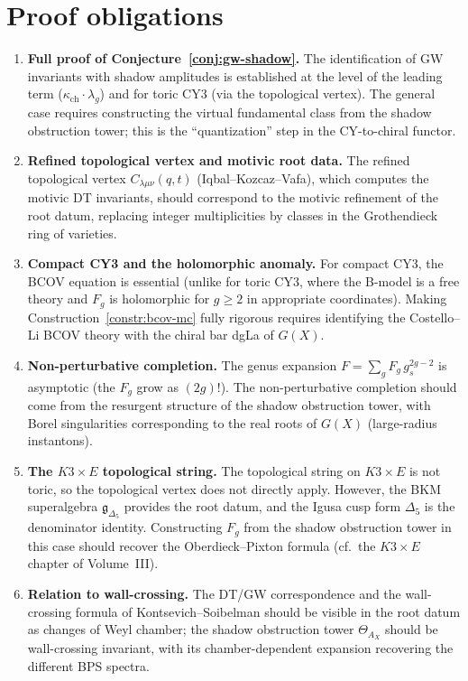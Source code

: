 \documentclass[11pt]{amsart}
\theoremstyle{plain}
\theoremstyle{definition}
\theoremstyle{remark}
\begin{document}
\section{Proof obligations}
\label{sec:open}

\begin{enumerate}[label=\textbf{Q\arabic*.}]
 \item \textbf{Full proof of Conjecture~\ref{conj:gw-shadow}.} The
 identification of GW invariants with shadow amplitudes is established at
 the level of the leading term ($\kappa_{\mathrm{ch}} \cdot \lambda_g$) and for toric
 CY3 (via the topological vertex). The general case requires constructing
 the virtual fundamental class from the shadow obstruction tower; this is the
 ``quantization'' step in the CY-to-chiral functor.

 \item \textbf{Refined topological vertex and motivic root data.} The
 refined topological vertex $C_{\lambda\mu\nu}(q,t)$ (Iqbal--Kozcaz--Vafa),
 which computes the motivic DT invariants, should correspond to the
 motivic refinement of the root datum, replacing integer multiplicities
 by classes in the Grothendieck ring of varieties.

 \item \textbf{Compact CY3 and the holomorphic anomaly.} For compact CY3,
 the BCOV equation is essential (unlike for toric CY3, where the B-model
 is a free theory and $F_g$ is holomorphic for $g \geq 2$ in appropriate
 coordinates). Making Construction~\ref{constr:bcov-mc} fully rigorous
 requires identifying the Costello--Li BCOV theory with the chiral bar
 dgLa of $G(X)$.

 \item \textbf{Non-perturbative completion.} The genus expansion $F = \sum_g
 F_g\, g_s^{2g-2}$ is asymptotic (the $F_g$ grow as $(2g)!$). The
 non-perturbative completion should come from the resurgent structure of the
 shadow obstruction tower, with Borel singularities corresponding to the real roots of
 $G(X)$ (large-radius instantons).

 \item \textbf{The $K3 \times E$ topological string.} The topological
 string on $K3 \times E$ is not toric, so the topological vertex does not
 directly apply. However, the BKM superalgebra $\mathfrak{g}_{\Delta_5}$
 provides the root datum, and the Igusa cusp form $\Delta_5$ is the
 denominator identity. Constructing $F_g$ from the shadow obstruction tower in this
 case should recover the Oberdieck--Pixton formula
 (cf.\ the $K3 \times E$ chapter of Volume~III).

 \item \textbf{Relation to wall-crossing.} The DT/GW correspondence and the
 wall-crossing formula of Kontsevich--Soibelman should be visible in the
 root datum as changes of Weyl chamber; the shadow obstruction tower $\Theta_{A_X}$
 should be wall-crossing invariant, with its chamber-dependent expansion
 recovering the different BPS spectra.
\end{enumerate}
\end{document}
